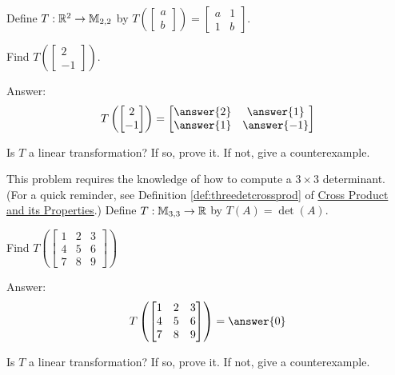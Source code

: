 \documentclass{ximera}
\begin{document}
\begin{problem}
Define $T:\mathbb{R}^2\rightarrow\mathbb{M}_{2,2}$ by $T\left(\begin{bmatrix}a\\b\end{bmatrix}\right)=\begin{bmatrix}a&1\\1&b\end{bmatrix}$.

\begin{problem}\label{prob:lintransr2toM22part1}
Find $T\left(\begin{bmatrix}2\\-1\end{bmatrix}\right)$.

Answer: $$T\left(\begin{bmatrix}2\\-1\end{bmatrix}\right)=\begin{bmatrix}\answer{2}&\answer{1}\\\answer{1}&\answer{-1}\end{bmatrix}$$
\end{problem}
\begin{problem}\label{prob:lintransr2toM22part2}
Is $T$ a linear transformation?  If so, prove it.  If not, give a counterexample.
\end{problem}
\end{problem}

\begin{problem}  This problem requires the knowledge of how to compute a $3\times 3$ determinant. (For a quick reminder, see Definition \ref{def:threedetcrossprod} of \href{\xmbaseurl/VEC-0080/main}{Cross Product and its Properties}.)
Define $T:\mathbb{M}_{3,3}\rightarrow \mathbb{R}$ by $T(A)=\det(A)$.  

\begin{problem}\label{prob:detlintrans1}
Find $T\left(\begin{bmatrix}1&2&3\\4&5&6\\7&8&9\end{bmatrix}\right)$

Answer: $$T\left(\begin{bmatrix}1&2&3\\4&5&6\\7&8&9\end{bmatrix}\right)=\answer{0}$$
\end{problem}

\begin{problem}\label{prob:detlintrans2}
Is $T$ a linear transformation?  If so, prove it.  If not, give a counterexample.
\end{problem}
\end{problem}
\end{document}
